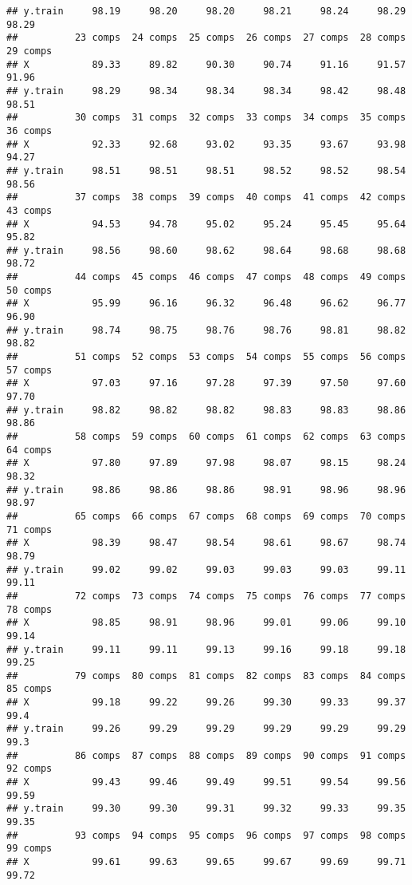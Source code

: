 \documentclass[
]{article}
\begin{document}
\begin{verbatim}
## y.train     98.19     98.20     98.20     98.21     98.24     98.29     98.29
##          23 comps  24 comps  25 comps  26 comps  27 comps  28 comps  29 comps
## X           89.33     89.82     90.30     90.74     91.16     91.57     91.96
## y.train     98.29     98.34     98.34     98.34     98.42     98.48     98.51
##          30 comps  31 comps  32 comps  33 comps  34 comps  35 comps  36 comps
## X           92.33     92.68     93.02     93.35     93.67     93.98     94.27
## y.train     98.51     98.51     98.51     98.52     98.52     98.54     98.56
##          37 comps  38 comps  39 comps  40 comps  41 comps  42 comps  43 comps
## X           94.53     94.78     95.02     95.24     95.45     95.64     95.82
## y.train     98.56     98.60     98.62     98.64     98.68     98.68     98.72
##          44 comps  45 comps  46 comps  47 comps  48 comps  49 comps  50 comps
## X           95.99     96.16     96.32     96.48     96.62     96.77     96.90
## y.train     98.74     98.75     98.76     98.76     98.81     98.82     98.82
##          51 comps  52 comps  53 comps  54 comps  55 comps  56 comps  57 comps
## X           97.03     97.16     97.28     97.39     97.50     97.60     97.70
## y.train     98.82     98.82     98.82     98.83     98.83     98.86     98.86
##          58 comps  59 comps  60 comps  61 comps  62 comps  63 comps  64 comps
## X           97.80     97.89     97.98     98.07     98.15     98.24     98.32
## y.train     98.86     98.86     98.86     98.91     98.96     98.96     98.97
##          65 comps  66 comps  67 comps  68 comps  69 comps  70 comps  71 comps
## X           98.39     98.47     98.54     98.61     98.67     98.74     98.79
## y.train     99.02     99.02     99.03     99.03     99.03     99.11     99.11
##          72 comps  73 comps  74 comps  75 comps  76 comps  77 comps  78 comps
## X           98.85     98.91     98.96     99.01     99.06     99.10     99.14
## y.train     99.11     99.11     99.13     99.16     99.18     99.18     99.25
##          79 comps  80 comps  81 comps  82 comps  83 comps  84 comps  85 comps
## X           99.18     99.22     99.26     99.30     99.33     99.37      99.4
## y.train     99.26     99.29     99.29     99.29     99.29     99.29      99.3
##          86 comps  87 comps  88 comps  89 comps  90 comps  91 comps  92 comps
## X           99.43     99.46     99.49     99.51     99.54     99.56     99.59
## y.train     99.30     99.30     99.31     99.32     99.33     99.35     99.35
##          93 comps  94 comps  95 comps  96 comps  97 comps  98 comps  99 comps
## X           99.61     99.63     99.65     99.67     99.69     99.71     99.72

\end{verbatim}
\end{document}
